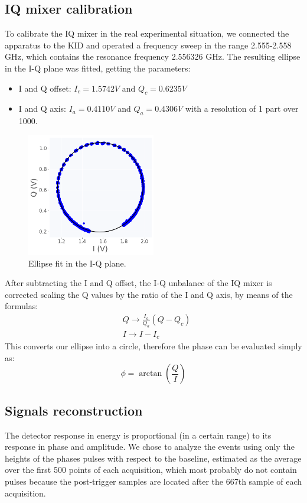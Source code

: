 \documentclass[12pt]{article}
\begin{document}
\subsection{IQ mixer calibration}
To calibrate the IQ mixer in the real experimental situation, we connected the apparatus to the KID and operated a frequency sweep in the range 2.555-2.558 GHz, which contains the resonance frequency 2.556326 GHz. The resulting ellipse in the I-Q plane was fitted, getting the parameters:
\begin{itemize}
\item I and Q offset: $I_c = 1.5742 V$ and $Q_c = 0.6235 V$
\item I and Q axis: $I_a = 0.4110 V$  and $Q_a = 0.4306 V$
with a resolution of 1 part over 1000.
\end{itemize}
\begin{figure}[H]
\centering
\includegraphics[width=0.5\textwidth]{ellipse.png}
\caption{Ellipse fit in the I-Q plane.}
\end{figure}
After subtracting the I and Q offset, the I-Q unbalance of the IQ mixer is corrected scaling the Q values by the ratio of the I and Q axis, by means of the formulas:
\begin{align}
& Q \to \frac{I_a}{Q_a}(Q-Q_c) \\
& I \to I - I_c
\end{align}
This converts our ellipse into a circle, therefore the phase can be evaluated simply as:
\begin{equation}
\phi = \arctan \left( \frac{Q}{I} \right)
\end{equation}

\subsection{Signals reconstruction}
The detector response in energy is proportional (in a certain range) to its response in phase and amplitude. We chose to analyze the events using only the heights of the phases pulses with respect to the baseline, estimated as the average over the first 500 points of each acquisition, which most probably do not contain pulses because the post-trigger samples are located after the 667th sample of each acquisition.
\end{document}
